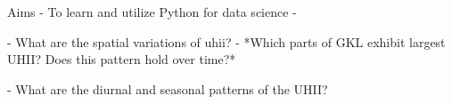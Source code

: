 {\textit\large{Aims}}
- To learn and utilize Python for data science
- 


- What are the spatial variations of \Gls{uhii}?
    - *Which parts of GKL exhibit largest UHII? Does this pattern hold over time?*

- What are the diurnal and seasonal patterns of the UHII?



